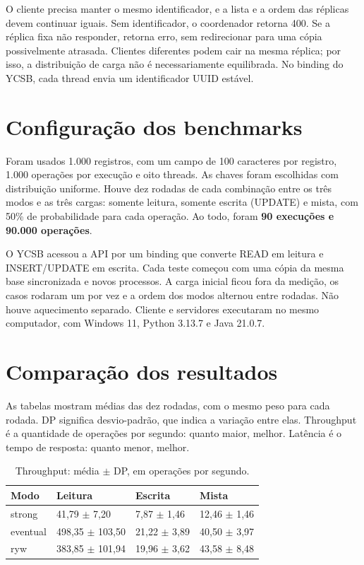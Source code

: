 O cliente precisa manter o mesmo identificador, e a lista e a ordem das
réplicas devem continuar iguais. Sem identificador, o coordenador retorna
400. Se a réplica fixa não responder, retorna erro, sem redirecionar para
uma cópia possivelmente atrasada. Clientes diferentes podem cair na mesma
réplica; por isso, a distribuição de carga não é necessariamente equilibrada.
No binding do YCSB, cada thread envia um identificador UUID estável.

\section{Configuração dos benchmarks}
Foram usados 1.000 registros, com um campo de 100 caracteres por registro,
1.000 operações por execução e oito threads. As chaves foram escolhidas
com distribuição uniforme. Houve dez rodadas de cada combinação entre os
três modos e as três cargas: somente leitura, somente escrita (UPDATE)
e mista, com 50\% de probabilidade para cada operação. Ao todo, foram
\textbf{90 execuções e 90.000 operações}.

O YCSB acessou a API por um binding que converte READ em leitura e INSERT/UPDATE
em escrita. Cada teste começou com uma cópia da mesma base sincronizada e
novos processos. A carga inicial ficou fora da medição, os casos rodaram
um por vez e a ordem dos modos alternou entre rodadas. Não houve aquecimento
separado. Cliente e servidores executaram no mesmo computador, com Windows 11,
Python 3.13.7 e Java 21.0.7.

\section{Comparação dos resultados}
As tabelas mostram médias das dez rodadas, com o mesmo peso para cada rodada.
DP significa desvio-padrão, que indica a variação entre elas. Throughput é a
quantidade de operações por segundo: quanto maior, melhor. Latência é o tempo
de resposta: quanto menor, melhor.

\begin{table}[!ht]
\centering\small\setlength{\tabcolsep}{4pt}
\caption{Throughput: média $\pm$ DP, em operações por segundo.}
\begin{tabular}{llll}
\toprule
Modo & Leitura & Escrita & Mista\\\midrule
strong & 41,79 $\pm$ 7,20 & 7,87 $\pm$ 1,46 & 12,46 $\pm$ 1,46\\
eventual & 498,35 $\pm$ 103,50 & 21,22 $\pm$ 3,89 & 40,50 $\pm$ 3,97\\
ryw & 383,85 $\pm$ 101,94 & 19,96 $\pm$ 3,62 & 43,58 $\pm$ 8,48\\
\bottomrule\end{tabular}
\end{table}

